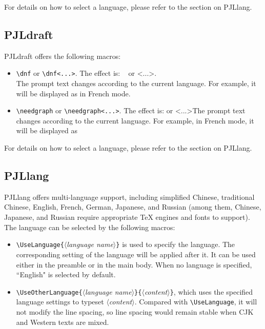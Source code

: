 \documentclass[allowbf,regionalref,puretext]{lebhart}
\providecommand{\meta}[1]{$\langle${\normalfont\itshape#1}$\rangle$}
\providecommand{\PJLdraft}{\textsf{PJLdraft}}
\providecommand{\PJLlang}{\textsf{PJLlang}}
\begin{document}
For details on how to select a language, please refer to the section on \PJLlang{}.

\subsection{PJLdraft}

\PJLdraft{} offers the following macros:
\begin{itemize}
    \item \lstinline|\dnf| or \lstinline|\dnf<...>|. The effect is: \dnf~ or \dnf<...>. \\The prompt text changes according to the current language. For example, it will be displayed as  in French mode.
    \item \lstinline|\needgraph| or \lstinline|\needgraph<...>|. The effect is: \needgraph or \needgraph<...>The prompt text changes according to the current language. For example, in French mode, it will be displayed as 
\end{itemize}

For details on how to select a language, please refer to the section on \PJLlang{}.

\subsection{PJLlang}

\PJLlang{} offers multi-language support, including simplified Chinese, traditional Chinese, English, French, German, Japanese, and Russian (among them, Chinese, Japanese, and Russian require appropriate \TeX{} engines and fonts to support). The language can be selected by the following macros:

\begin{itemize}
    \item \lstinline|\UseLanguage{|\meta{language name}\lstinline|}| is used to specify the language. The corresponding setting of the language will be applied after it. It can be used either in the preamble or in the main body. When no language is specified, ``English" is selected by default.
    \item \lstinline|\UseOtherLanguage{|\meta{language name}\lstinline|}{|\meta{content}\lstinline|}|, which uses the specified language settings to typeset \meta{content}. Compared with \lstinline|\UseLanguage|, it will not modify the line spacing, so line spacing would remain stable when CJK and Western texts are mixed.
\end{itemize}
\end{document}
